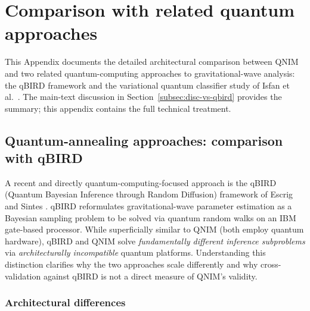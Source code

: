 \documentclass[11pt,a4paper, english]{book}
\theoremstyle{plain}
\theoremstyle{definition}
\numberwithin{equation}{chapter}
\numberwithin{figure}{chapter}
\numberwithin{table}{chapter}
\begin{document}
\chapter{Comparison with related quantum approaches}
\label{app:related-quantum}

This Appendix documents the detailed architectural comparison between QNIM and
two related quantum-computing approaches to gravitational-wave analysis:
the qBIRD framework \cite{Escrig_2024_qBIRD} and the variational quantum
classifier study of Isfan et al.~\cite{Isfan_2026}. The main-text
discussion in Section~\ref{subsec:disc-vs-qbird} provides the summary;
this appendix contains the full technical treatment.

\section{Quantum-annealing approaches: comparison with qBIRD}
\label{app:qbird-comparison}

A recent and directly quantum-computing-focused approach is the qBIRD
(Quantum Bayesian Inference through Random Diffusion) framework of
Escrig and Sintes \cite{Escrig_2024_qBIRD}. qBIRD reformulates gravitational-wave
parameter estimation as a Bayesian sampling problem to be solved via
quantum random walks on an IBM gate-based processor. While superficially
similar to QNIM (both employ quantum hardware), qBIRD and QNIM solve
\emph{fundamentally different inference subproblems} via \emph{architecturally
incompatible} quantum platforms. Understanding this distinction clarifies why
the two approaches scale differently and why cross-validation against qBIRD
is not a direct measure of QNIM's validity.

\subsection{Architectural differences}
\end{document}
